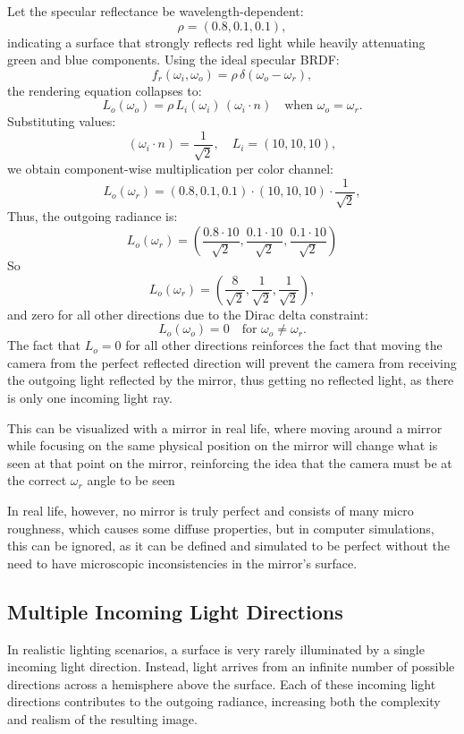 \documentclass[12pt]{article}
\begin{document}
Let the specular reflectance be wavelength-dependent:
\[
\rho = (0.8, 0.1, 0.1),
\]
indicating a surface that strongly reflects red light while heavily attenuating green and blue components.
Using the ideal specular BRDF:
\[
f_r(\omega_i, \omega_o) = \rho \, \delta(\omega_o - \omega_r),
\]
the rendering equation collapses to:
\[
L_o(\omega_o) = \rho \, L_i(\omega_i)\, (\omega_i \cdot n)
\quad \text{when } \omega_o = \omega_r.
\]
Substituting values:
\[
(\omega_i \cdot n) = \frac{1}{\sqrt{2}}, \quad L_i = (10,10,10),
\]
we obtain component-wise multiplication per color channel:
\[
L_o(\omega_r) = (0.8, 0.1, 0.1) \cdot (10, 10, 10) \cdot \frac{1}{\sqrt{2}},
\]
Thus, the outgoing radiance is:
\[
L_o(\omega_r) =
\left(
\frac{0.8\cdot10}{\sqrt{2}},
\frac{0.1\cdot10}{\sqrt{2}},
\frac{0.1\cdot10}{\sqrt{2}}
\right)
\]
So
\[
L_o(\omega_r) =
\left(
\frac{8}{\sqrt{2}},
\frac{1}{\sqrt{2}},
\frac{1}{\sqrt{2}}
\right),
\]
and zero for all other directions due to the Dirac delta constraint:
\[
L_o(\omega_o) = 0 \quad \text{for } \omega_o \neq \omega_r.
\]
The fact that $L_o = 0$ for all other directions reinforces the fact that moving the camera from the perfect reflected direction will prevent the camera from receiving the outgoing light reflected by the mirror, thus getting no reflected light, as there is only one incoming light ray. 

This can be visualized with a mirror in real life, where moving around a mirror while focusing on the same physical position on the mirror will change what is seen at that point on the mirror, reinforcing the idea that the camera must be at the correct $\omega_r$ angle to be seen

In real life, however, no mirror is truly perfect and consists of many micro roughness, which causes some diffuse properties, but in computer simulations, this can be ignored, as it can be defined and simulated to be perfect without the need to have microscopic inconsistencies in the mirror's surface. 


\subsection{Multiple Incoming Light Directions}

In realistic lighting scenarios, a surface is very rarely illuminated by a single incoming light direction. Instead, light arrives from an infinite number of possible directions across a hemisphere above the surface. Each of these incoming light directions contributes to the outgoing radiance, increasing both the complexity and realism of the resulting image. 
\end{document}
